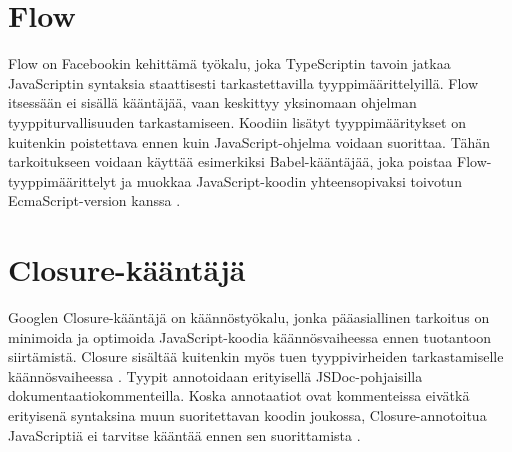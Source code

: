\section{Flow}
Flow on Facebookin kehittämä työkalu, joka TypeScriptin tavoin jatkaa
JavaScriptin syntaksia staattisesti tarkastettavilla tyyppimäärittelyillä.
Flow itsessään ei sisällä kääntäjää, vaan keskittyy yksinomaan ohjelman
tyyppiturvallisuuden tarkastamiseen. Koodiin lisätyt tyyppimääritykset on
kuitenkin poistettava ennen kuin JavaScript-ohjelma voidaan suorittaa. Tähän
tarkoitukseen voidaan käyttää esimerkiksi Babel-kääntäjää, joka poistaa
Flow-tyyppimäärittelyt ja muokkaa JavaScript-koodin yhteensopivaksi toivotun
EcmaScript-version kanssa \cite{FlowInstallation}.

\section{Closure-kääntäjä}
Googlen Closure-kääntäjä on käännöstyökalu, jonka pääasiallinen tarkoitus
on minimoida ja optimoida JavaScript-koodia käännösvaiheessa ennen tuotantoon
siirtämistä. Closure sisältää kuitenkin myös tuen tyyppivirheiden
tarkastamiselle käännösvaiheessa \cite{ClosureCompiler}. Tyypit annotoidaan
erityisellä JSDoc-pohjaisilla dokumentaatiokommenteilla. Koska annotaatiot
ovat kommenteissa eivätkä erityisenä syntaksina muun suoritettavan koodin
joukossa, Closure-annotoitua JavaScriptiä ei tarvitse kääntää ennen sen
suorittamista \cite{annotatingJSforClosure}.